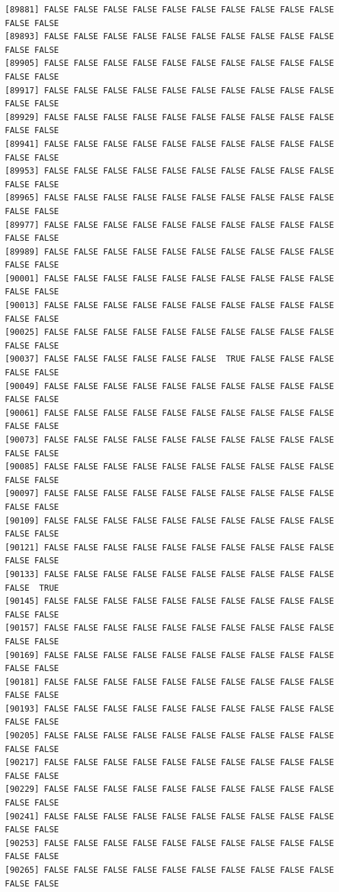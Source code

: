 \documentclass[
  a4paper,
  DIV=11,
  numbers=noendperiod]{scrartcl}
\begin{document}
\begin{verbatim}
[89881] FALSE FALSE FALSE FALSE FALSE FALSE FALSE FALSE FALSE FALSE FALSE FALSE
[89893] FALSE FALSE FALSE FALSE FALSE FALSE FALSE FALSE FALSE FALSE FALSE FALSE
[89905] FALSE FALSE FALSE FALSE FALSE FALSE FALSE FALSE FALSE FALSE FALSE FALSE
[89917] FALSE FALSE FALSE FALSE FALSE FALSE FALSE FALSE FALSE FALSE FALSE FALSE
[89929] FALSE FALSE FALSE FALSE FALSE FALSE FALSE FALSE FALSE FALSE FALSE FALSE
[89941] FALSE FALSE FALSE FALSE FALSE FALSE FALSE FALSE FALSE FALSE FALSE FALSE
[89953] FALSE FALSE FALSE FALSE FALSE FALSE FALSE FALSE FALSE FALSE FALSE FALSE
[89965] FALSE FALSE FALSE FALSE FALSE FALSE FALSE FALSE FALSE FALSE FALSE FALSE
[89977] FALSE FALSE FALSE FALSE FALSE FALSE FALSE FALSE FALSE FALSE FALSE FALSE
[89989] FALSE FALSE FALSE FALSE FALSE FALSE FALSE FALSE FALSE FALSE FALSE FALSE
[90001] FALSE FALSE FALSE FALSE FALSE FALSE FALSE FALSE FALSE FALSE FALSE FALSE
[90013] FALSE FALSE FALSE FALSE FALSE FALSE FALSE FALSE FALSE FALSE FALSE FALSE
[90025] FALSE FALSE FALSE FALSE FALSE FALSE FALSE FALSE FALSE FALSE FALSE FALSE
[90037] FALSE FALSE FALSE FALSE FALSE FALSE  TRUE FALSE FALSE FALSE FALSE FALSE
[90049] FALSE FALSE FALSE FALSE FALSE FALSE FALSE FALSE FALSE FALSE FALSE FALSE
[90061] FALSE FALSE FALSE FALSE FALSE FALSE FALSE FALSE FALSE FALSE FALSE FALSE
[90073] FALSE FALSE FALSE FALSE FALSE FALSE FALSE FALSE FALSE FALSE FALSE FALSE
[90085] FALSE FALSE FALSE FALSE FALSE FALSE FALSE FALSE FALSE FALSE FALSE FALSE
[90097] FALSE FALSE FALSE FALSE FALSE FALSE FALSE FALSE FALSE FALSE FALSE FALSE
[90109] FALSE FALSE FALSE FALSE FALSE FALSE FALSE FALSE FALSE FALSE FALSE FALSE
[90121] FALSE FALSE FALSE FALSE FALSE FALSE FALSE FALSE FALSE FALSE FALSE FALSE
[90133] FALSE FALSE FALSE FALSE FALSE FALSE FALSE FALSE FALSE FALSE FALSE  TRUE
[90145] FALSE FALSE FALSE FALSE FALSE FALSE FALSE FALSE FALSE FALSE FALSE FALSE
[90157] FALSE FALSE FALSE FALSE FALSE FALSE FALSE FALSE FALSE FALSE FALSE FALSE
[90169] FALSE FALSE FALSE FALSE FALSE FALSE FALSE FALSE FALSE FALSE FALSE FALSE
[90181] FALSE FALSE FALSE FALSE FALSE FALSE FALSE FALSE FALSE FALSE FALSE FALSE
[90193] FALSE FALSE FALSE FALSE FALSE FALSE FALSE FALSE FALSE FALSE FALSE FALSE
[90205] FALSE FALSE FALSE FALSE FALSE FALSE FALSE FALSE FALSE FALSE FALSE FALSE
[90217] FALSE FALSE FALSE FALSE FALSE FALSE FALSE FALSE FALSE FALSE FALSE FALSE
[90229] FALSE FALSE FALSE FALSE FALSE FALSE FALSE FALSE FALSE FALSE FALSE FALSE
[90241] FALSE FALSE FALSE FALSE FALSE FALSE FALSE FALSE FALSE FALSE FALSE FALSE
[90253] FALSE FALSE FALSE FALSE FALSE FALSE FALSE FALSE FALSE FALSE FALSE FALSE
[90265] FALSE FALSE FALSE FALSE FALSE FALSE FALSE FALSE FALSE FALSE FALSE FALSE

\end{verbatim}
\end{document}
